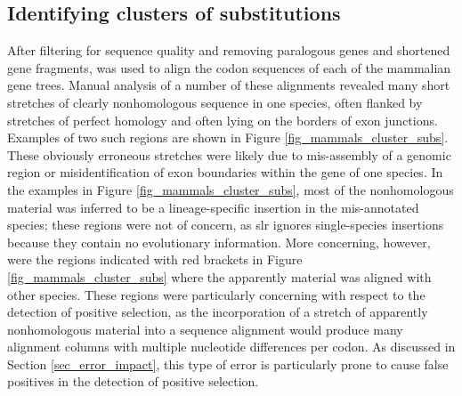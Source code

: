 \subsection{Identifying clusters of \nsyn substitutions}
\label{section_windows_clustered_subs}

After filtering for sequence quality and removing paralogous genes and
shortened gene fragments, \prankc was used to align the codon
sequences of each of the \ntrees mammalian gene trees. Manual analysis
of a number of these alignments revealed many short stretches of
clearly nonhomologous sequence in one species, often flanked by
stretches of perfect homology and often lying on the borders of exon
junctions. Examples of two such regions are shown in Figure
\ref{fig_mammals_cluster_subs}.  These obviously erroneous stretches
were likely due to mis-assembly of a genomic region or
misidentification of exon boundaries within the gene of one
species. In the examples in Figure \ref{fig_mammals_cluster_subs},
most of the nonhomologous material was inferred to be a
lineage-specific insertion in the mis-annotated species; these regions
were not of concern, as \ac{slr} ignores single-species insertions
because they contain no evolutionary information. More concerning,
however, were the regions indicated with red brackets in Figure
\ref{fig_mammals_cluster_subs} where the apparently \nhom material was
aligned with other species. These regions were particularly concerning
with respect to the detection of positive selection, as the
incorporation of a stretch of apparently nonhomologous material into a
sequence alignment would produce many alignment columns with multiple
nucleotide differences per codon. As discussed in Section
\ref{sec_error_impact}, this type of error is particularly prone to
cause false positives in the detection of positive selection.

